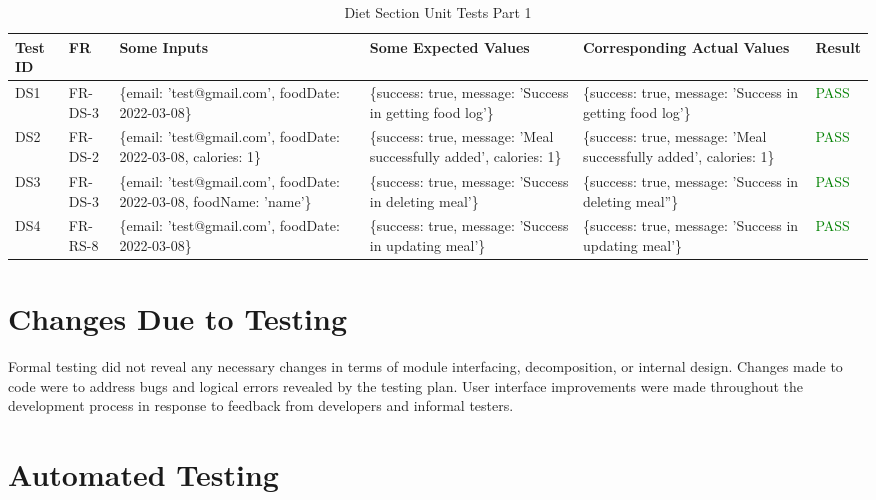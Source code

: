 \documentclass[12pt, titlepage]{article}
\begin{document}
\begin{table}[h]
    \centering
    \small
    \begin{tabularx}{\textwidth}{|X|X|p{3cm}|p{2.5cm}|p{2.5cm}|X|}
        \hline
        Test ID & FR & Some Inputs & Some Expected Values & Corresponding Actual Values & Result \\
        \hline
        DS1 & FR-DS-3 & \{email: 'test@gmail.com', foodDate: 2022-03-08\}  & \{success: true, message: 'Success in getting food log'\} & \{success: true, message: 'Success in getting food log'\} & \textcolor{Green}{PASS} \\
	\hline
        DS2 & FR-DS-2 & \{email: 'test@gmail.com', foodDate: 2022-03-08, calories: 1\}  & \{success: true, message: 'Meal successfully added', calories: 1\} & \{success: true, message: 'Meal successfully added', calories: 1\} & \textcolor{Green}{PASS} \\
        \hline
        DS3 & FR-DS-3 & \{email: 'test@gmail.com', foodDate: 2022-03-08, foodName: 'name'\}  & \{success: true, message: 'Success in deleting meal'\} & \{success: true, message: 'Success in deleting meal''\} & \textcolor{Green}{PASS} \\
        \hline
        DS4 & FR-RS-8 & \{email: 'test@gmail.com', foodDate: 2022-03-08\}  & \{success: true, message: 'Success in updating meal'\} & \{success: true, message: 'Success in updating meal'\} & \textcolor{Green}{PASS} \\
        \hline
    \end{tabularx}
    \caption{Diet Section Unit Tests Part 1}
    \label{table:diet-unit-tests}
\end{table}

\newpage

\section{Changes Due to Testing}
Formal testing did not reveal any necessary changes in terms of module interfacing, decomposition, or internal design. Changes made to code were to address bugs and logical errors revealed by the testing plan. User interface improvements were made throughout the development process in response to feedback from developers and informal testers.

\section{Automated Testing}
\end{document}
